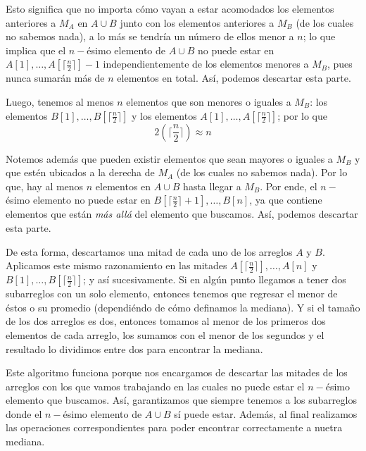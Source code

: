 \documentclass[letterpaper,11pt]{article}
\begin{document}
\begin{enumerate}
    Esto significa que no importa cómo vayan a estar acomodados los elementos
    anteriores a $M_A$ en $A \cup B$ junto con los elementos anteriores a 
    $M_B$ (de los cuales no sabemos nada), a lo más se tendría un número de 
    ellos menor a $n$; lo que implica que el $n-$ésimo elemento de $A \cup B$ 
    no puede estar en $A[1], \ldots, A[\lceil \frac{n}{2} \rceil] - 1$ 
    independientemente de los elementos menores a $M_B$, pues nunca sumarán 
    más de $n$ elementos en total. Así, podemos descartar esta parte. 

    Luego, tenemos al menos $n$ elementos que son menores o iguales a $M_B$: 
    los elementos $B[1], \ldots, B[\lceil \frac{n}{2} \rceil]$ y los 
    elementos $A[1], \ldots, A[\lceil \frac{n}{2} \rceil]$; por lo que 
    \begin{equation*}
        2 \left(\lceil \frac{n}{2} \rceil\right) \approx n
    \end{equation*}

    Notemos además que pueden existir elementos que sean mayores o iguales a 
    $M_B$ y que estén ubicados a la derecha de $M_A$ (de los cuales no sabemos 
    nada). Por lo que, hay al menos $n$ elementos en $A \cup B$ hasta llegar a 
    $M_B$. Por ende, el $n-$ésimo elemento no puede estar en 
    $B[\lceil \frac{n}{2} \rceil + 1], \ldots, B[n]$, ya que contiene elementos 
    que están \textit{más allá} del elemento que buscamos. Así, podemos 
    descartar esta parte. 

    De esta forma, descartamos una mitad de cada uno de los arreglos $A$ y $B$.
    Aplicamos este mismo razonamiento en las mitades 
    $A[\lceil \frac{n}{2} \rceil], \ldots, A[n]$ y 
    $B[1], \ldots, B[\lceil \frac{n}{2} \rceil]$; y así sucesivamente. Si en 
    algún punto llegamos a tener dos subarreglos con un solo elemento, entonces 
    tenemos que regresar el menor de éstos o su promedio (dependiéndo de cómo 
    definamos la mediana). Y si el tamaño de los dos arreglos es dos, entonces 
    tomamos al menor de los primeros dos elementos de cada arreglo, los sumamos 
    con el menor de los segundos y el resultado lo dividimos entre dos para 
    encontrar la mediana. 

    Este algoritmo funciona porque nos encargamos de descartar las mitades de 
    los arreglos con los que vamos trabajando en las cuales no puede estar el 
    $n-$ésimo elemento que buscamos. Así, garantizamos que siempre tenemos a 
    los subarreglos donde el $n-$ésimo elemento de $A \cup B$ sí puede estar.
    Además, al final realizamos las operaciones correspondientes para poder 
    encontrar correctamente a nuetra mediana. 


\end{enumerate}
\end{document}
